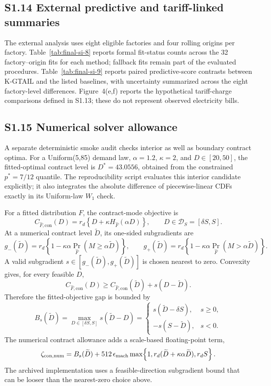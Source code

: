 \documentclass[]{interact}
\begin{document}
\subsection*{S1.14 External predictive and tariff-linked summaries}

The external analysis uses eight eligible factories and four rolling
origins per factory. Table~\ref{tab:final-si-8} reports formal fit-status
counts across the 32 factory--origin fits for each method; fallback fits
remain part of the evaluated procedures. Table~\ref{tab:final-si-9}
reports paired predictive-score contrasts between K-GTAIL and the listed
baselines, with uncertainty summarized across the eight factory-level
differences. Figure~4(e,f) reports the hypothetical tariff-charge
comparisons defined in S1.13; these do not represent observed
electricity bills.


\subsection*{S1.15 Numerical solver allowance}

A separate deterministic smoke audit checks interior as well as
boundary contract optima. For a Uniform(5,85) demand law,
$\alpha=1.2$, $\kappa=2$, and $D\in[20,50]$, the fitted-optimal
contract level is $D^*=43.0556$, obtained from the constrained
$p^*=7/12$ quantile. The reproducibility script evaluates this
interior candidate explicitly; it also integrates the absolute
difference of piecewise-linear CDFs exactly in its Uniform-law
$W_1$ check.

For a fitted distribution $\widehat F$, the contract-mode objective is
\[
C_{\widehat F,\mathrm{con}}(D)
=r_d\left\{D+\kappa H_{\widehat F}(\alpha D)\right\},
\qquad D\in\mathcal D_S=[\delta S,S].
\]
At a numerical contract level $\widetilde D$, its one-sided
subgradients are
\[
g_-(\widetilde D)
=r_d\left\{1-\kappa\alpha\Pr_{\widehat F}(M\geq\alpha\widetilde D)\right\},
\qquad
g_+(\widetilde D)
=r_d\left\{1-\kappa\alpha\Pr_{\widehat F}(M>\alpha\widetilde D)\right\}.
\]
A valid subgradient $s\in[g_-(\widetilde D),g_+(\widetilde D)]$ is
chosen nearest to zero. Convexity gives, for every feasible $D$,
\[
C_{\widehat F,\mathrm{con}}(D)
\geq
C_{\widehat F,\mathrm{con}}(\widetilde D)
+s(D-\widetilde D).
\]
Therefore the fitted-objective gap is bounded by
\[
B_s(\widetilde D)
=\max_{D\in[\delta S,S]}s(\widetilde D-D)
=\begin{cases}
s(\widetilde D-\delta S),&s\geq0,\\
-s(S-\widetilde D),&s<0.
\end{cases}
\]
The numerical contract allowance adds a scale-based floating-point
term,
\[
\zeta_{\mathrm{con,num}}
=B_s(\widetilde D)
+512\,\epsilon_{\rm mach}
\max\!\left\{1,
 r_d(\widetilde D+\kappa\alpha\widetilde D),r_d S\right\}.
\]
The archived implementation uses a feasible-direction subgradient
bound that can be looser than the nearest-zero choice above.
\end{document}
